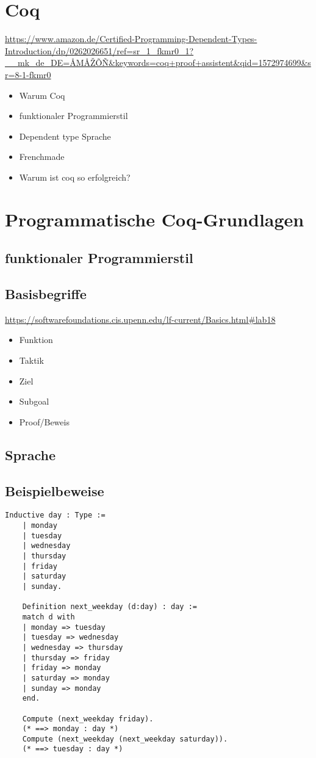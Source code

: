 \section{Coq}
\url{https://www.amazon.de/Certified-Programming-Dependent-Types-Introduction/dp/0262026651/ref=sr_1_fkmr0_1?__mk_de_DE=ÅMÅŽÕÑ&keywords=coq+proof+assistent&qid=1572974699&sr=8-1-fkmr0}
\begin{itemize}
	\item Warum Coq
	\item funktionaler Programmierstil
	\item Dependent type Sprache
	\item Frenchmade
	\item Warum ist coq so erfolgreich?
\end{itemize}

\section{Programmatische Coq-Grundlagen}
\subsection{funktionaler Programmierstil}
\subsection{Basisbegriffe}
\url{https://softwarefoundations.cis.upenn.edu/lf-current/Basics.html#lab18}
\begin{itemize}
	\item Funktion
	\item Taktik
	\item Ziel
	\item Subgoal
	\item Proof/Beweis
\end{itemize}
\subsection{Sprache}
\subsection{Beispielbeweise}

\begin{lstlisting}[language=coq,firstnumber=1,caption=Coq Beispiel,label=lst:api-config]
	Inductive day : Type :=
	| monday
	| tuesday
	| wednesday
	| thursday
	| friday
	| saturday
	| sunday.

	Definition next_weekday (d:day) : day :=
	match d with
	| monday => tuesday
	| tuesday => wednesday
	| wednesday => thursday
	| thursday => friday
	| friday => monday
	| saturday => monday
	| sunday => monday
	end.

	Compute (next_weekday friday).
	(* ==> monday : day *)
	Compute (next_weekday (next_weekday saturday)).
	(* ==> tuesday : day *)
\end{lstlisting}

